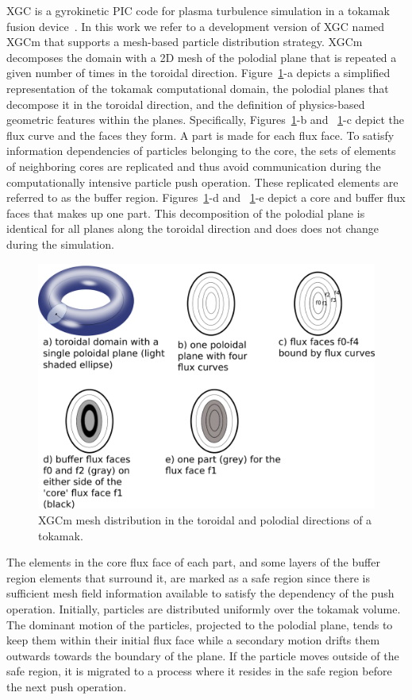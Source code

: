 \documentclass[conference]{IEEEtran}
\begin{document}
XGC is a gyrokinetic PIC code for plasma turbulence simulation in a tokamak
fusion device~\cite{chang2004numerical,Ku2016467,ku2009}.
In this work we refer to a development version of XGC named XGCm that supports
a mesh-based particle distribution strategy.
XGCm decomposes the domain with a 2D mesh of the
polodial plane that is repeated a given number of times in the toroidal direction.
Figure~\ref{fig:xgcmPtn}-a depicts a simplified representation of the tokamak computational
domain, the polodial planes that decompose it in the toroidal direction, and the
definition of physics-based geometric features within the planes.
Specifically, Figures~\ref{fig:xgcmPtn}-b and ~\ref{fig:xgcmPtn}-c depict the
flux curve and the faces they form. A part is made for each flux face.
To satisfy information dependencies of particles belonging to the core, the sets
of elements of neighboring cores are replicated and thus avoid communication
during the computationally intensive particle push operation.
These replicated elements are referred to as the buffer region.
Figures~\ref{fig:xgcmPtn}-d and ~\ref{fig:xgcmPtn}-e depict a core and buffer
flux faces that makes up one part. 
This decomposition of the polodial plane is identical for all planes along the
toroidal direction and does does not change during the simulation.

\begin{figure}[!ht]
  \centering
  \includegraphics[width=.4\textwidth]{../figures/xgcm_partition.png}
  \caption{XGCm mesh distribution in the toroidal and polodial directions of a tokamak.}
  \label{fig:xgcmPtn}
\end{figure}

The elements in the core flux face of each part, and some layers of the
buffer region elements that surround it, are marked as a safe region since there is
sufficient mesh field information available to satisfy the dependency of the
push operation.
Initially, particles are distributed uniformly over the tokamak volume.
The dominant motion of the particles, projected to the polodial plane, tends to
keep them within their initial flux face while a secondary motion drifts them
outwards towards the boundary of the plane.
If the particle moves outside of the safe region, it is migrated to a process
where it resides in the safe region before the next push operation.
\end{document}
